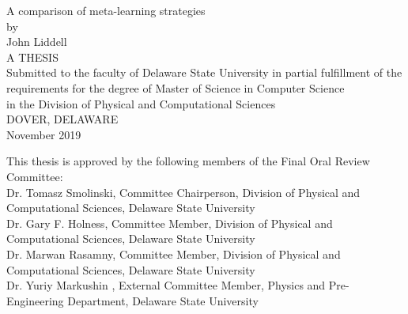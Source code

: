 \begin{titlepage}
  \begin{center}
      A comparison of meta-learning strategies\\
      \vspace{17mm}
      by\\
      \vspace{10mm}
      John Liddell\\
      \vspace{35mm}
      A THESIS\\
      \vspace{7mm}
      Submitted to the faculty of Delaware State University in partial fulfillment of the\\
      requirements for the degree of Master of Science in Computer Science\\
      in the Division of Physical and Computational Sciences\\
      \vspace{7mm}
      DOVER, DELAWARE\\
      November 2019\\
  \end{center}

  \vspace{15mm}

  \begin{flushleft}
    This thesis is approved by the following members of the Final Oral Review Committee:\\
    \vspace{6mm}
    Dr. Tomasz Smolinski, Committee Chairperson, Division of Physical and Computational Sciences, Delaware State University\\
    \vspace{3mm}
    Dr. Gary F. Holness, Committee Member, Division of Physical and Computational Sciences, Delaware State University\\
    \vspace{3mm}
    Dr. Marwan Rasamny, Committee Member, Division of Physical and Computational Sciences, Delaware State University\\
    \vspace{3mm}
    Dr. Yuriy Markushin , External Committee Member, Physics and Pre-Engineering Department, Delaware State University\\
  \end{flushleft}
\end{titlepage}
